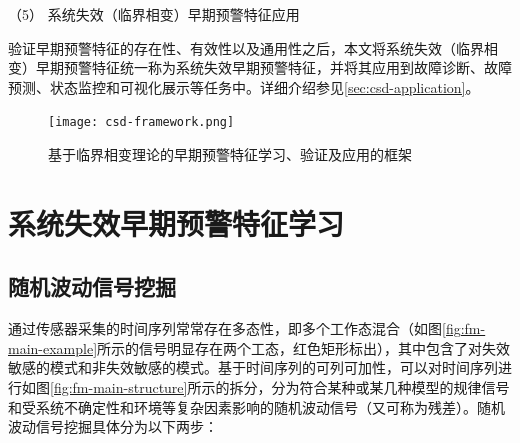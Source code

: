 （5） 系统失效（临界相变）早期预警特征应用

验证早期预警特征的存在性、有效性以及通用性之后，本文将系统失效（临界相变）早期预警特征统一称为{\heiti 系统失效早期预警特征}，并将其应用到故障诊断、故障预测、状态监控和可视化展示等任务中。详细介绍参见\ref{sec:csd-application}。

\begin{figure}[H]
\centering
\texttt{[image: csd-framework.png]}
\caption{基于临界相变理论的早期预警特征学习、验证及应用的框架}
\label{fig:csd-framework}
\end{figure}

\section{系统失效早期预警特征学习}
\label{sec:csd-feature}

\subsection{随机波动信号挖掘}
\label{sec:fluctuation-mining}

通过传感器采集的时间序列常常存在多态性，即多个工作态混合（如图\ref{fig:fm-main-example}所示的信号明显存在两个工态，红色矩形标出），其中包含了对失效敏感的模式和非失效敏感的模式。基于时间序列的可列可加性，可以对时间序列进行如图\ref{fig:fm-main-structure}所示的拆分，分为符合某种或某几种模型的规律信号和受系统不确定性和环境等复杂因素影响的随机波动信号（又可称为残差）。随机波动信号挖掘具体分为以下两步：

